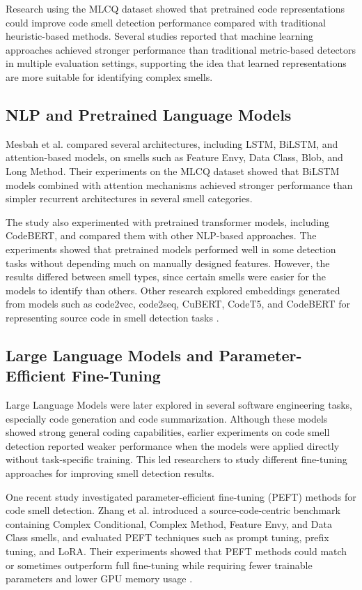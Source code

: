 Research using the MLCQ dataset showed that pretrained code representations could improve code smell detection performance compared with traditional heuristic-based methods. Several studies reported that machine learning approaches achieved stronger performance than traditional metric-based detectors in multiple evaluation settings, supporting the idea that learned representations are more suitable for identifying complex smells.

\subsection{NLP and Pretrained Language Models}

Mesbah et al. compared several architectures, including LSTM, BiLSTM, and attention-based models, on smells such as Feature Envy, Data Class, Blob, and Long Method. Their experiments on the MLCQ dataset showed that BiLSTM models combined with attention mechanisms achieved stronger performance than simpler recurrent architectures in several smell categories.

The study also experimented with pretrained transformer models, including CodeBERT, and compared them with other NLP-based approaches. The experiments showed that pretrained models performed well in some detection tasks without depending much on manually designed features. However, the results differed between smell types, since certain smells were easier for the models to identify than others. Other research explored embeddings generated from models such as code2vec, code2seq, CuBERT, CodeT5, and CodeBERT for representing source code in smell detection tasks \cite{mesbah2025nlp}.

\subsection{Large Language Models and Parameter-Efficient Fine-Tuning}

Large Language Models were later explored in several software engineering tasks, especially code generation and code summarization. Although these models showed strong general coding capabilities, earlier experiments on code smell detection reported weaker performance when the models were applied directly without task-specific training. This led researchers to study different fine-tuning approaches for improving smell detection results.

One recent study investigated parameter-efficient fine-tuning (PEFT) methods for code smell detection. Zhang et al. introduced a source-code-centric benchmark containing Complex Conditional, Complex Method, Feature Envy, and Data Class smells, and evaluated PEFT techniques such as prompt tuning, prefix tuning, and LoRA. Their experiments showed that PEFT methods could match or sometimes outperform full fine-tuning while requiring fewer trainable parameters and lower GPU memory usage \cite{zhang2024peftsmells}.


